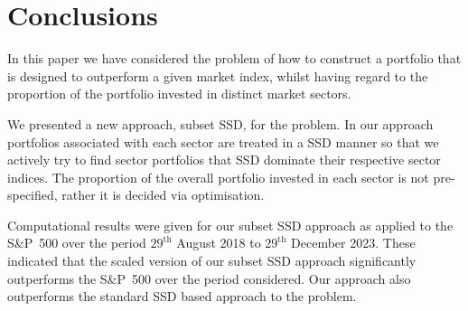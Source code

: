 \section{Conclusions}
\label{sec6}


In this paper we have considered the problem of
how to construct a portfolio that is
designed to outperform a given market index, whilst having regard to the proportion of the portfolio invested in distinct market sectors. 

We presented a new approach, subset SSD, for the problem.
In our approach portfolios associated with each sector are treated in a SSD manner so that we 
actively try to find sector portfolios that SSD dominate their respective sector indices.
The proportion of the overall portfolio 
invested in each sector is not pre-specified, rather it is decided via optimisation.

Computational results were given for our subset SSD approach as applied to the S\&P~500 over the period 
$29^{\text{th}}$ August 2018 to $29^{\text{th}}$ December 2023.
These indicated that the scaled version of our subset SSD
approach significantly outperforms the S\&P~500 over the period considered. Our approach also outperforms the standard SSD based
approach to the problem.



 \clearpage
\newpage
\linespread{1}
\small \normalsize 






